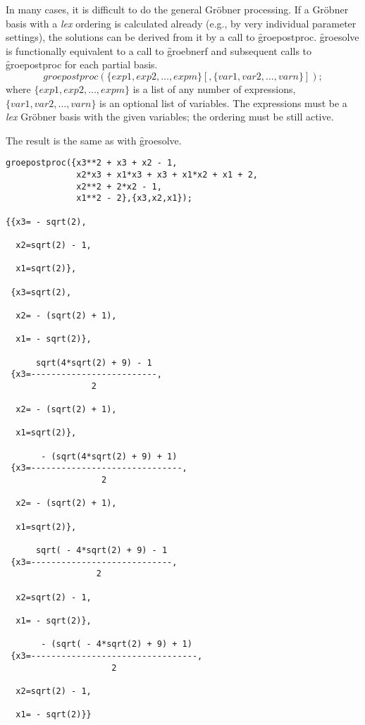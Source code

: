 \hypertarget{operator:GROEPOSTPROC}{}
In many cases, it is difficult to do the general Gr\"obner processing.
If a Gr\"obner basis with a \textit{lex} ordering is calculated already (e.g.,
by very individual parameter settings), the solutions can be derived
from it by a call to \f{groepostproc}. \f{groesolve} is functionally
equivalent to a call to \f{groebnerf} and subsequent calls to
\f{groepostproc} for each partial basis.
\[
 groepostproc(\{exp1, exp2, \ldots , expm\}[,\{var1, var2, \ldots ,
varn\}]);
\]
where $\{exp1, exp2, \ldots , expm\}$ is a list of any number of
expressions, \linebreak[4] $\{var1, var2, \ldots, varn\}$ is an
optional list of variables. The expressions must be a \textit{lex} Gr\"obner
basis with the given variables; the ordering must be still active.

The result is the same as with \f{groesolve}.

\begin{verbatim}
groepostproc({x3**2 + x3 + x2 - 1,
              x2*x3 + x1*x3 + x3 + x1*x2 + x1 + 2,
              x2**2 + 2*x2 - 1,
              x1**2 - 2},{x3,x2,x1});

{{x3= - sqrt(2),

  x2=sqrt(2) - 1,

  x1=sqrt(2)},

 {x3=sqrt(2),

  x2= - (sqrt(2) + 1),

  x1= - sqrt(2)},

      sqrt(4*sqrt(2) + 9) - 1
 {x3=-------------------------,
                 2

  x2= - (sqrt(2) + 1),

  x1=sqrt(2)},

       - (sqrt(4*sqrt(2) + 9) + 1)
 {x3=------------------------------,
                   2

  x2= - (sqrt(2) + 1),

  x1=sqrt(2)},

      sqrt( - 4*sqrt(2) + 9) - 1
 {x3=----------------------------,
                  2

  x2=sqrt(2) - 1,

  x1= - sqrt(2)},

       - (sqrt( - 4*sqrt(2) + 9) + 1)
 {x3=---------------------------------,
                     2

  x2=sqrt(2) - 1,

  x1= - sqrt(2)}}
\end{verbatim}

